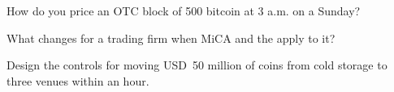 \begin{interviewq}\label{iq:m3:the-crypto-trading-business:4}
How do you price an OTC block of 500 bitcoin at 3 a.m. on a Sunday?
\end{interviewq}

\begin{interviewq}\label{iq:m3:the-crypto-trading-business:5}
What changes for a trading firm when MiCA and the  apply to it?
\end{interviewq}

\begin{interviewq}\label{iq:m3:the-crypto-trading-business:6}
Design the controls for moving USD~50 million of coins from cold storage to three venues within an hour.
\end{interviewq}
